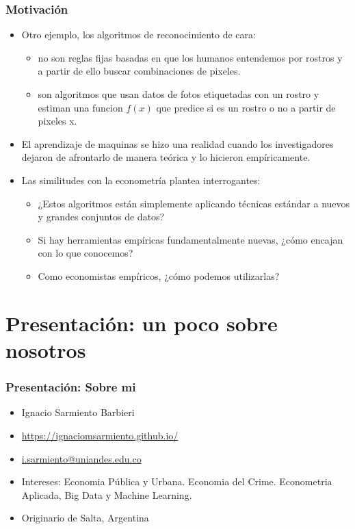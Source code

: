 \documentclass[
  shownotes,
  xcolor={svgnames},
  hyperref={colorlinks,citecolor=DarkBlue,linkcolor=DarkRed,urlcolor=DarkBlue}
  ]{beamer}
\begin{document}
\begin{frame}
\frametitle{Motivación}

\begin{itemize}
      \item Otro ejemplo, los algoritmos de reconocimiento de cara: 
      \medskip
      \begin{itemize}
        \item no son reglas fijas basadas en que los humanos entendemos por rostros y a partir de ello buscar combinaciones de pixeles.
        \item son algoritmos que usan datos de fotos etiquetadas con un rostro y estiman una funcion $f(x)$ que predice si es un rostro o no a partir de pixeles x.
      \end{itemize}
      \medskip
      \item El aprendizaje de maquinas se hizo una realidad cuando los investigadores dejaron de afrontarlo de manera teórica y lo hicieron empíricamente.
      \medskip
      \item  Las similitudes con la econometría plantea interrogantes:
      \begin{itemize}
      \item  ¿Estos algoritmos están simplemente aplicando técnicas estándar a nuevos y grandes conjuntos de datos? 
      \item  Si hay herramientas empíricas fundamentalmente nuevas, ¿cómo encajan con lo que conocemos? 
      \item  Como economistas empíricos, ¿cómo podemos utilizarlas?
       \end{itemize}
\end{itemize}

\end{frame}


\section{Presentación: un poco sobre nosotros}
\begin{frame}
\frametitle{Presentación: Sobre mi}

  \begin{itemize}
      \item  Ignacio Sarmiento Barbieri
      \medskip
      \item \url{https://ignaciomsarmiento.github.io/}
      \medskip
      \item \href{mailto:i.sarmiento@uniandes.edu.co}{i.sarmiento@uniandes.edu.co}
      \medskip
      \item Intereses: Economia Pública y Urbana. Economia del Crime. Econometria Aplicada, Big Data y Machine Learning.
      \medskip
      \item Originario de Salta, Argentina
  \end{itemize}

\end{frame}
\end{document}
